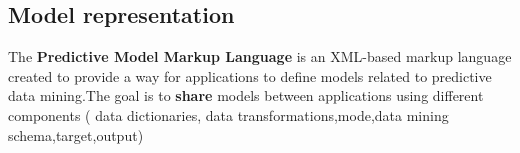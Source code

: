 \subsection{Model representation}
The \textbf{Predictive Model Markup Language} is an XML-based markup language created to provide a way for applications to define models related to predictive data mining.The goal is to \textbf{share} models between applications using different components ( data dictionaries, data transformations,mode,data mining schema,target,output)